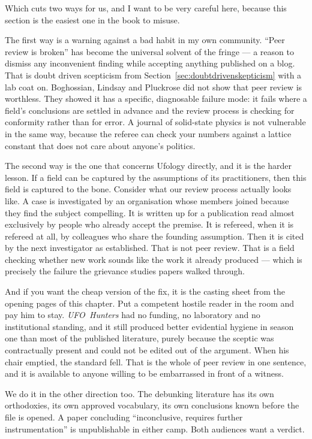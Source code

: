 Which cuts two ways for us, and I want to be very careful here, because this section
is the easiest one in the book to misuse.

The first way is a warning against a bad habit in my own community. ``Peer review is
broken'' has become the universal solvent of the fringe --- a reason to dismiss any
inconvenient finding while accepting anything published on a blog. That is doubt
driven scepticism from Section~\ref{sec:doubtdrivenskepticism} with a lab coat on. Boghossian, Lindsay and
Pluckrose did not show that peer review is worthless. They showed it has a specific,
diagnosable failure mode: it fails where a field's conclusions are settled in advance
and the review process is checking for conformity rather than for error. A journal of
solid-state physics is not vulnerable in the same way, because the referee can check
your numbers against a lattice constant that does not care about anyone's politics.

The second way is the one that concerns Ufology directly, and it is the harder
lesson. If a field can be captured by the assumptions of its practitioners, then this
field is captured to the bone. Consider what our review process actually looks like.
A case is investigated by an organisation whose members joined because they find the
subject compelling. It is written up for a publication read almost exclusively by
people who already accept the premise. It is refereed, when it is refereed at all, by
colleagues who share the founding assumption. Then it is cited by the next
investigator as established. That is not peer review. That is a field checking
whether new work sounds like the work it already produced --- which is precisely the
failure the grievance studies papers walked through.

And if you want the cheap version of the fix, it is the casting sheet from the opening pages of
this chapter. Put a competent hostile reader in the room and pay him to stay. \emph{UFO~Hunters}
had no funding, no laboratory and no institutional standing, and it still produced better
evidential hygiene in season one than most of the published literature, purely because the sceptic
was contractually present and could not be edited out of the argument. When his chair emptied, the
standard fell. That is the whole of peer review in one sentence, and it is available to anyone
willing to be embarrassed in front of a witness.

We do it in the other direction too. The debunking literature has its own
orthodoxies, its own approved vocabulary, its own conclusions known before the file is
opened. A paper concluding ``inconclusive, requires further instrumentation'' is
unpublishable in either camp. Both audiences want a verdict.

